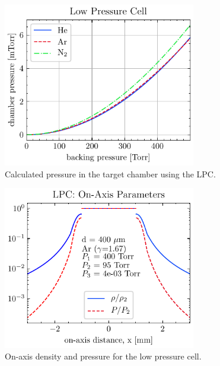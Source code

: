 \begin{figure}
	\centering
	\includegraphics[width=0.75\textwidth]{figures/chap3/LPC_chamber_p.pdf}
	\caption{Calculated pressure in the target chamber using the LPC.}
	\label{fig:LPC_chamber_p}
\end{figure}

\begin{figure}
	\centering
	\includegraphics[width=0.75\textwidth]{figures/chap3/LPC_on_axis.pdf}
	\caption{On-axis density and pressure for the low pressure cell.}
	\label{fig:LPC_on_axis}
\end{figure}

